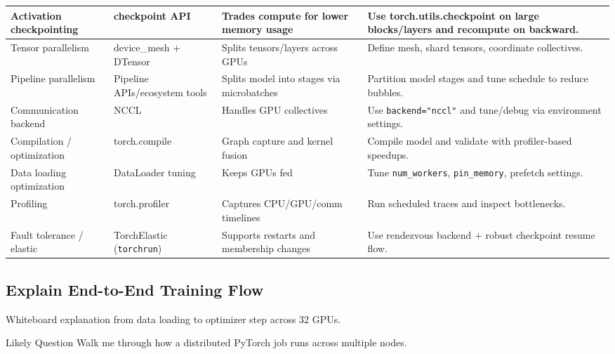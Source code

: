 \documentclass[12pt]{article}
\begin{document}
{\begin{tabularx}{0.98\textwidth}{|>{\raggedright\arraybackslash}p{2.2cm}|>{\raggedright\arraybackslash}p{2.3cm}|>{\raggedright\arraybackslash}p{2.5cm}|>{\raggedright\arraybackslash}X|}
\hline
Activation checkpointing & checkpoint API & Trades compute for lower memory usage & Use torch.utils.checkpoint on large blocks/layers and recompute on backward. \\
\hline
Tensor parallelism & device\_mesh + DTensor & Splits tensors/layers across GPUs & Define mesh, shard tensors, coordinate collectives. \\
\hline
Pipeline parallelism & Pipeline APIs/ecosystem tools & Splits model into stages via microbatches & Partition model stages and tune schedule to reduce bubbles. \\
\hline
Communication backend & NCCL & Handles GPU collectives & Use \texttt{backend="nccl"} and tune/debug via environment settings. \\
\hline
Compilation / optimization & torch.compile & Graph capture and kernel fusion & Compile model and validate with profiler-based speedups. \\
\hline
Data loading optimization & DataLoader tuning & Keeps GPUs fed & Tune \texttt{num\_workers}, \texttt{pin\_memory}, prefetch settings. \\
\hline
Profiling & torch.profiler & Captures CPU/GPU/comm timelines & Run scheduled traces and inspect bottlenecks. \\
\hline
Fault tolerance / elastic & TorchElastic (\texttt{torchrun}) & Supports restarts and membership changes & Use rendezvous backend + robust checkpoint resume flow. \\
\hline
\end{tabularx}
}

\subsection{Explain End-to-End Training Flow}
Whiteboard explanation from data loading to optimizer step across 32 GPUs.

\vspace{0.5cm}

\begin{greenbox}{Likely Question}
Walk me through how a distributed PyTorch job runs across multiple nodes.
\end{greenbox}
\end{document}

